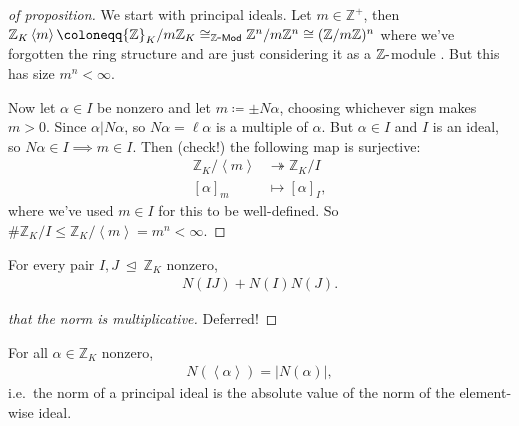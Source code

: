 \begin{proof}[of proposition]

We start with principal ideals. Let \(m\in {\mathbb{Z}}^+\), then
\({\mathbb{Z}}_K \left\langle{ m }\right\rangle \coloneqq{\mathbb{Z}}_K /m {\mathbb{Z}}_K \cong_{{\mathbb{Z}{\hbox{-}}\mathsf{Mod}}} {\mathbb{Z}}^n / m{\mathbb{Z}}^n \cong ({\mathbb{Z}}/m{\mathbb{Z}})^n\)
where we've forgotten the ring structure and are just considering it as
a \({\mathbb{Z}}{\hbox{-}}\)module . But this has size \(m^n < \infty\).

Now let \(\alpha\in I\) be nonzero and let \(m \coloneqq\pm N \alpha\),
choosing whichever sign makes \(m>0\). Since
\(\alpha\mathrel{\Big|}N \alpha\), so \(N \alpha = \ell \alpha\) is a
multiple of \(\alpha\). But \(\alpha\in I\) and \(I\) is an ideal, so
\(N \alpha\in I \implies m \in I\). Then (check!) the following map is
surjective:
\begin{align*}
{\mathbb{Z}}_K/ \left\langle{ m }\right\rangle &\twoheadrightarrow{\mathbb{Z}}_K/I \\
[ \alpha]_m &\mapsto [ \alpha]_I
,\end{align*}
where we've used \(m\in I\) for this to be well-defined. So
\(\# {\mathbb{Z}}_K /I \leq {\mathbb{Z}}_K / \left\langle{ m }\right\rangle = m^n < \infty\).

\end{proof}

\begin{theorem}

For every pair \(I, J{~\trianglelefteq~}{\mathbb{Z}}_K\) nonzero,
\begin{align*}
N( IJ) + N(I) N(J)
.\end{align*}

\end{theorem}

\begin{proof}[that the norm is multiplicative]

Deferred!

\end{proof}

\begin{theorem}

For all \(\alpha\in {\mathbb{Z}}_K\) nonzero,
\begin{align*}
N( \left\langle{ \alpha }\right\rangle) = {\left\lvert { N ( \alpha ) } \right\rvert}
,\end{align*}
i.e.~the norm of a principal ideal is the absolute value of the norm of
the element-wise ideal.

\end{theorem}

